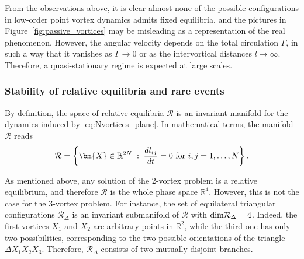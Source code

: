 \documentclass[a4paper]{article}
\numberwithin{equation}{section}
\begin{document}
From the observations above, it is clear almost none of the possible configurations in low-order point vortex dynamics admits fixed equilibria, and the pictures in Figure~\ref{fig:passive_vortices} may be misleading as a representation of the real phenomenon. However, the angular velocity depends on the total circulation $\Gamma$, in such a way that it vanishes as $\Gamma\rightarrow0$ or as the intervortical distances $l\rightarrow\infty$. Therefore, a quasi-stationary regime is expected at large scales.

\subsubsection{Stability of relative equilibria and rare events}
By definition, the space of relative equilibria $\mathcal{R}$ is an invariant manifold for the dynamics induced by \eqref{eq:Nvortices_plane}. In mathematical terms, the manifold $\mathcal{R}$ reads
\begin{equation}
    \label{eq:relative_equilibria_manifold}
\mathcal{R}= \left\{ \bm{X}\in\mathbb{R}^{2N} \; : \;  \frac{d l_{ij}}{dt}=0 \textup{ for } i,j=1,\ldots,N \right\}.
\end{equation}

As mentioned above, any solution of the 2-vortex problem is a relative equilibrium, and therefore $\mathcal{R}$ is the whole phase space $\mathbb{R}^{4}$. However, this is not the case for the 3-vortex problem. For instance, the set of equilateral triangular configurations $\mathcal{R}_\Delta$ is an invariant submanifold of $\mathcal{R}$ with $\textup{dim}\mathcal{R}_\Delta=4$. Indeed, the first vortices $X_1$ and $X_2$ are arbitrary points in $\mathbb{R}^2$, while the third one has only two possibilities, corresponding to the two possible orientations of the triangle $\Delta X_1 X_2 X_3$. Therefore, $\mathcal{R}_\Delta$ consists of two mutually disjoint branches.
\end{document}

